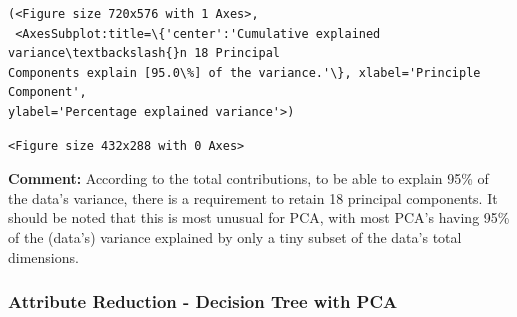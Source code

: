\documentclass[11pt]{article}
\makeatletter
\newcommand{\boxspacing}{\kern\kvtcb@left@rule\kern\kvtcb@boxsep}
\newcommand{\prompt}[4]{
        {\ttfamily\llap{{\color{#2}[#3]:\hspace{3pt}#4}}\vspace{-\baselineskip}}
    }
\makeatother
\begin{document}
            \begin{tcolorbox}[breakable, size=fbox, boxrule=.5pt, pad at break*=1mm, opacityfill=0]
\prompt{Out}{outcolor}{68}{\boxspacing}
\begin{Verbatim}[commandchars=\\\{\}]
(<Figure size 720x576 with 1 Axes>,
 <AxesSubplot:title=\{'center':'Cumulative explained variance\textbackslash{}n 18 Principal
Components explain [95.0\%] of the variance.'\}, xlabel='Principle Component',
ylabel='Percentage explained variance'>)
\end{Verbatim}
\end{tcolorbox}
        
    
    \begin{Verbatim}[commandchars=\\\{\}]
<Figure size 432x288 with 0 Axes>
    \end{Verbatim}

    
    \textbf{Comment:} According to the total contributions, to be able to
explain 95\% of the data's variance, there is a requirement to retain 18
principal components. It should be noted that this is most unusual for
PCA, with most PCA's having 95\% of the (data's) variance explained by
only a tiny subset of the data's total dimensions.

    \hypertarget{attribute-reduction---decision-tree-with-pca}{%
\subsubsection{Attribute Reduction - Decision Tree with
PCA}\label{attribute-reduction---decision-tree-with-pca}}
\end{document}
